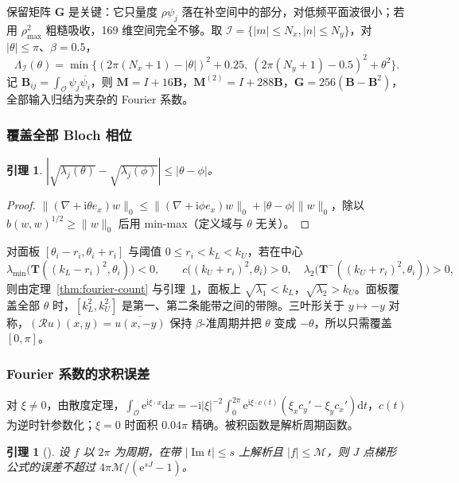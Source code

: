 \documentclass[11pt,a4paper,fontset=fandol]{ctexart}
\newcommand{\ii}{\mathrm{i}}
\newcommand{\ee}{\mathrm{e}}
\newcommand{\dd}{\mathrm{d}}
\theoremstyle{plain}
\newtheorem{lemma}[theorem]{引理}
\theoremstyle{definition}
\theoremstyle{remark}
\begin{document}
保留矩阵 $\bm G$ 是关键：它只量度 $\rho\psi_j$ 落在补空间中的部分，对低频平面波很小；若用 $\rho_{\max}^2$ 粗糙吸收，169 维空间完全不够。取 $\mathcal I=\{|m|\le N_x,|n|\le N_y\}$，对 $|\theta|\le\pi$、$\beta=0.5$，
\[
\Lambda_{\mathcal I}(\theta)=\min\bigl\{(2\pi(N_x+1)-|\theta|)^2+0.25,\ (2\pi(N_y+1)-0.5)^2+\theta^2\bigr\}.
\]
记 $\bm B_{ij}=\int_{\mathcal O}\psi_j\overline{\psi_i}$，则 $\bm M=I+16\bm B$，$\bm M^{(2)}=I+288\bm B$，$\bm G=256(\bm B-\bm B^2)$，全部输入归结为夹杂的 Fourier 系数。

\subsubsection{覆盖全部 Bloch 相位}

\begin{lemma}
\label{lem:lipschitz}
$|\sqrt{\lambda_j(\theta)}-\sqrt{\lambda_j(\phi)}|\le|\theta-\phi|$。
\end{lemma}

\begin{proof}
$\|(\nabla+\ii\theta e_x)w\|_0\le\|(\nabla+\ii\phi e_x)w\|_0+|\theta-\phi|\|w\|_0$，除以 $b(w,w)^{1/2}\ge\|w\|_0$ 后用 min-max（定义域与 $\theta$ 无关）。
\end{proof}

对面板 $[\theta_i-r_i,\theta_i+r_i]$ 与阈值 $0\le r_i<k_L<k_U$，若在中心
\[
\lambda_{\min}\bigl(\bm T((k_L-r_i)^2,\theta_i)\bigr)<0,\qquad c\bigl((k_U+r_i)^2,\theta_i\bigr)>0,\quad\lambda_2\bigl(\bm T^-((k_U+r_i)^2,\theta_i)\bigr)>0,
\]
则由定理~\ref{thm:fourier-count} 与引理~\ref{lem:lipschitz}，面板上 $\sqrt{\lambda_1}<k_L$，$\sqrt{\lambda_2}>k_U$。面板覆盖全部 $\theta$ 时，$[k_L^2,k_U^2]$ 是第一、第二条能带之间的带隙。三叶形关于 $y\mapsto-y$ 对称，$(\mathcal Ru)(x,y)=\overline{u(x,-y)}$ 保持 $\beta$-准周期并把 $\theta$ 变成 $-\theta$，所以只需覆盖 $[0,\pi]$。

\subsubsection{Fourier 系数的求积误差}

对 $\xi\ne0$，由散度定理，$\int_{\mathcal O}\ee^{\ii\xi\cdot x}\dd x=-\ii|\xi|^{-2}\int_0^{2\pi}\ee^{\ii\xi\cdot c(t)}(\xi_xc_y'-\xi_yc_x')\dd t$，$c(t)$ 为逆时针参数化；$\xi=0$ 时面积 $0.04\pi$ 精确。被积函数是解析周期函数。

\begin{lemma}[\cite{TrefethenWeideman2014}]
\label{lem:trapezoid}
设 $f$ 以 $2\pi$ 为周期，在带 $|\operatorname{Im}t|\le s$ 上解析且 $|f|\le\mathcal M$，则 $J$ 点梯形公式的误差不超过 $4\pi\mathcal M/(\ee^{sJ}-1)$。
\end{lemma}
\end{document}
